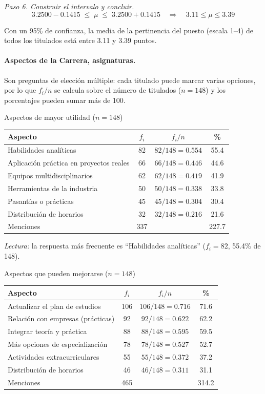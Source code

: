 \textit{Paso 6. Construir el intervalo y concluir.}
\[
3.2500 - 0.1415 \;\le\; \mu \;\le\; 3.2500 + 0.1415 \quad\Longrightarrow\quad 3.11 \le \mu \le 3.39
\]

Con un 95\% de confianza, la media de la pertinencia del puesto (escala 1--4) de todos los titulados está entre 3.11 y 3.39 puntos.

\paragraph{Aspectos de la Carrera, asignaturas.} Son preguntas de elección múltiple: cada titulado puede marcar varias opciones, por lo que $f_i/n$ se calcula sobre el número de titulados ($n = 148$) y los porcentajes pueden sumar más de 100.

\begin{mitabla}{Aspectos de mayor utilidad ($n=148$)}
\begin{tabular}{lccc}
\toprule
Aspecto & $f_i$ & $f_i / n$ & \% \\
\midrule
Habilidades analíticas & 82 & $82/148 = 0.554$ & 55.4 \\
Aplicación práctica en proyectos reales & 66 & $66/148 = 0.446$ & 44.6 \\
Equipos multidisciplinarios & 62 & $62/148 = 0.419$ & 41.9 \\
Herramientas de la industria & 50 & $50/148 = 0.338$ & 33.8 \\
Pasantías o prácticas & 45 & $45/148 = 0.304$ & 30.4 \\
Distribución de horarios & 32 & $32/148 = 0.216$ & 21.6 \\
\midrule
Menciones & 337 & & 227.7 \\
\bottomrule
\end{tabular}
\end{mitabla}

\textit{Lectura:} la respuesta más frecuente es ``Habilidades analíticas'' ($f_i = 82$, 55.4\% de 148).

\begin{mitabla}{Aspectos que pueden mejorarse ($n=148$)}
\begin{tabular}{lccc}
\toprule
Aspecto & $f_i$ & $f_i / n$ & \% \\
\midrule
Actualizar el plan de estudios & 106 & $106/148 = 0.716$ & 71.6 \\
Relación con empresas (prácticas) & 92 & $92/148 = 0.622$ & 62.2 \\
Integrar teoría y práctica & 88 & $88/148 = 0.595$ & 59.5 \\
Más opciones de especialización & 78 & $78/148 = 0.527$ & 52.7 \\
Actividades extracurriculares & 55 & $55/148 = 0.372$ & 37.2 \\
Distribución de horarios & 46 & $46/148 = 0.311$ & 31.1 \\
\midrule
Menciones & 465 & & 314.2 \\
\bottomrule
\end{tabular}
\end{mitabla}

